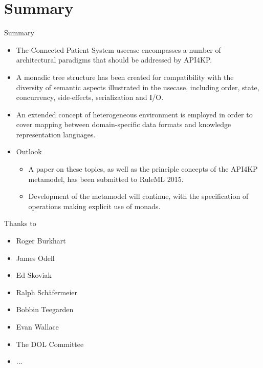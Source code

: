 \documentclass{beamer}
\begin{document}
\section*{Summary}

\begin{frame}{Summary}
  \begin{itemize}
  \item
    The Connected Patient System usecase encompasses a number of architectural paradigms that should be addressed by API4KP.
  \item
    A monadic tree structure has been created for compatibility with the diversity of semantic aspects illustrated in the usecase, including order, state, concurrency, side-effects, serialization and I/O.
  \item
    An extended concept of heterogeneous environment is employed in order to cover mapping between domain-specific data formats and knowledge representation languages.
  \end{itemize}
  
  \begin{itemize}
  \item
    Outlook
    \begin{itemize}
    \item
      A paper on these topics, as well as the principle concepts of the API4KP metamodel, has been submitted to RuleML 2015.
    \item
      Development of the metamodel will continue, with the specification of operations making explicit use of monads.
    \end{itemize}
  \end{itemize}
\end{frame}

\begin{frame}{Thanks to}
\begin{itemize}
\item Roger Burkhart
\item James Odell
\item Ed Skoviak
\item Ralph Sch\"afermeier
\item Bobbin Teegarden
\item Evan Wallace
\item The DOL Committee
\item ...
\end{itemize}
\end{frame}
\end{document}
